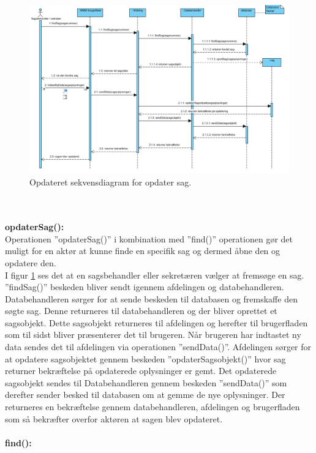 \begin{figure}[htb!]
  \includegraphics[scale = 0.62]{./PNG/analyse/opdaterSag.PNG} 
  \caption{Opdateret sekvensdiagram for opdater sag.}
  \label{fig:2opdater}
\end{figure} \\ \\
\textbf{opdaterSag():} \label{opdaterSag}\\
Operationen ”opdaterSag()” i kombination med ”find()” operationen gør det muligt for en aktør at kunne finde en specifik sag og dermed åbne den og opdatere den.  \\
I figur \ref{fig:2opdater} ses det at en sagsbehandler eller sekretæren vælger at fremsøge en sag. ”findSag()” beskeden bliver sendt igennem afdelingen og databehandleren. Databehandleren sørger for at sende beskeden til databasen og fremskaffe den søgte sag. Denne returneres til databehandleren og der bliver oprettet et sagsobjekt. Dette sagsobjekt returneres til afdelingen og herefter til brugerfladen som til sidst bliver præsenterer det til brugeren. Når brugeren har indtastet ny data sendes det til afdelingen via operationen ”sendData()”. Afdelingen sørger for at opdatere sagsobjektet gennem beskeden ”opdaterSagsobjekt()” hvor sag returner bekræftelse på opdaterede oplysninger er gemt. Det opdaterede sagsobjekt sendes til Databehandleren gennem beskeden ”sendData()” som derefter sender besked til databasen om at gemme de nye oplysninger. Der returneres en bekræftelse gennem databehandleren, afdelingen og brugerfladen som så bekræfter overfor aktøren at sagen blev opdateret.  \\ \\
\textbf{find():} \label{find}\\
